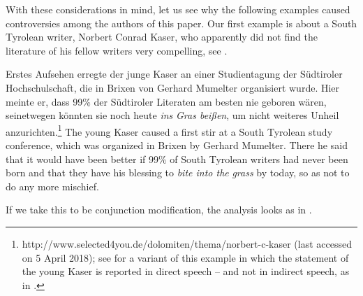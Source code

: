\documentclass[output=paper]{langsci/langscibook}
\begin{document}
With these considerations in mind, let us see why the following examples caused controversies among the authors of this paper. Our first example is about a South Tyrolean writer, Norbert Conrad Kaser, who apparently did not find the literature of his fellow writers very compelling, see .

\ea \label{home grass}
Erstes Aufsehen erregte der junge Kaser an einer Studientagung der Süd\-tiroler Hochschulschaft, die in Brixen von Gerhard Mumelter organisiert wurde. Hier meinte er, dass 99\% der Südtiroler Literaten am besten nie geboren wären, seinetwegen könnten sie noch heute \textit{ins} \underline{} \textit{Gras beißen}, um nicht weiteres Unheil anzurichten.\footnote{http://www.selected4you.de/dolomiten/thema/norbert-c-kaser (last accessed on 5 April 2018); see \cite[][91]{stathi07} for a variant of this example in which the statement of the young Kaser is reported in direct speech -- and not in indirect speech, as in .}
\vspace{5pt}
\glt The young Kaser caused a first stir at a South Tyrolean study conference, which was organized in Brixen by Gerhard Mumelter. There he said that it would have been better if 99\% of South Tyrolean writers had never been born and that they have his blessing to \textit{bite into the} \underline{} \textit{grass} by today, so as not to do any more mischief.
\z

\noindent If we take this to be conjunction modification, the analysis looks as in .
\end{document}
